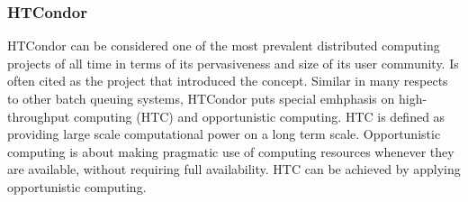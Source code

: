 \documentclass{sig-alternate}
\begin{document}
%
%

%
%
\subsubsection{HTCondor}
\label{sec:htcondor}

HTCondor can be considered one of the most prevalent distributed computing
projects of all time in terms of its pervasiveness and size of its user
community.
Is often cited as the project that introduced the \pilotjob concept.\cite{}
Similar in many respects to other batch queuing systems, HTCondor puts special
emhphasis on high-throughput computing (HTC) and opportunistic computing.
HTC is defined as providing large scale computational power on a long term
scale.
Opportunistic computing is about making pragmatic use of computing resources
whenever they are available, without requiring full availability.
HTC can be achieved by applying opportunistic computing.
\end{document}
